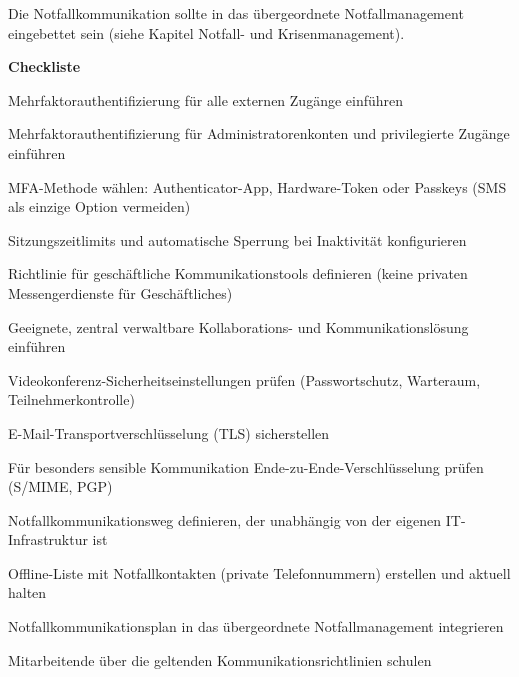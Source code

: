 Die Notfallkommunikation sollte in das übergeordnete Notfallmanagement eingebettet sein (siehe Kapitel Notfall- und Krisenmanagement).

\textbf{Checkliste}
\begin{checklist}
\item Mehrfaktorauthentifizierung für alle externen Zugänge einführen
\item Mehrfaktorauthentifizierung für Administratorenkonten und privilegierte Zugänge einführen
\item MFA-Methode wählen: Authenticator-App, Hardware-Token oder Passkeys (SMS als einzige Option vermeiden)
\item Sitzungszeitlimits und automatische Sperrung bei Inaktivität konfigurieren
\item Richtlinie für geschäftliche Kommunikationstools definieren (keine privaten Messengerdienste für Geschäftliches)
\item Geeignete, zentral verwaltbare Kollaborations- und Kommunikationslösung einführen
\item Videokonferenz-Sicherheitseinstellungen prüfen (Passwortschutz, Warteraum, Teilnehmerkontrolle)
\item E-Mail-Transportverschlüsselung (TLS) sicherstellen
\item Für besonders sensible Kommunikation Ende-zu-Ende-Verschlüsselung prüfen (S/MIME, PGP)
\item Notfallkommunikationsweg definieren, der unabhängig von der eigenen IT-Infrastruktur ist
\item Offline-Liste mit Notfallkontakten (private Telefonnummern) erstellen und aktuell halten
\item Notfallkommunikationsplan in das übergeordnete Notfallmanagement integrieren
\item Mitarbeitende über die geltenden Kommunikationsrichtlinien schulen
\end{checklist}
